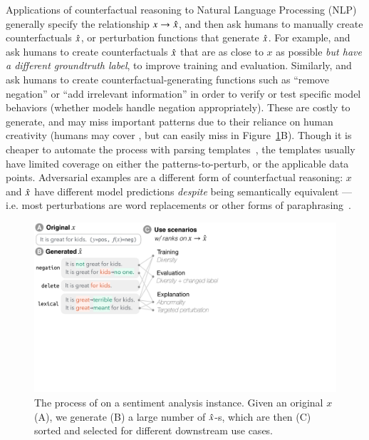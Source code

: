 Applications of counterfactual reasoning to Natural Language Processing (NLP) generally specify the relationship $x \rightarrow \hat{x}$, and then ask humans to manually create counterfactuals $\hat{x}$, or perturbation functions that generate $\hat{x}$.
For example, \citet{gardner2020contrast} and \citet{kaushik2019learning} ask humans to create counterfactuals $\hat{x}$ that are as close to $x$ as possible \emph{but have a different groundtruth label}, to improve training and evaluation. 
Similarly, \citet{wu2019errudite} and \citet{checklist:acl20} ask humans to create counterfactual-generating functions such as ``remove negation'' or ``add irrelevant information'' in order to verify or test specific model behaviors (\eg whether models handle negation appropriately).
These are costly to generate, and may miss important patterns due to their reliance on human creativity (\eg humans may cover , but can easily miss  in Figure~\ref{fig:teaser}B).
Though it is cheaper to automate the process with parsing templates~\cite{li2020linguistically}, the templates usually have limited coverage on either the patterns-to-perturb, or the applicable data points.
Adversarial examples are a different form of counterfactual reasoning: $x$ and $\hat{x}$ have different model predictions \emph{despite} being semantically equivalent --- i.e. most perturbations are word replacements or other forms of paraphrasing~\cite{iyyer2018adversarial, ribeiro2018semantically}.

\begin{figure}[t]
\centering
\includegraphics[trim={0 17cm 26cm 0cm},clip, width=1\columnwidth]{figures/teaser}
\vspace{-15pt}
\caption{
The process of \sysname on a sentiment analysis instance.
Given an original $x$ (A), we generate (B) a large number of $\hat{x}$-s, which are then (C) sorted and selected for different downstream use cases.}
\vspace{-15pt}
\label{fig:teaser}
\end{figure} 
 

